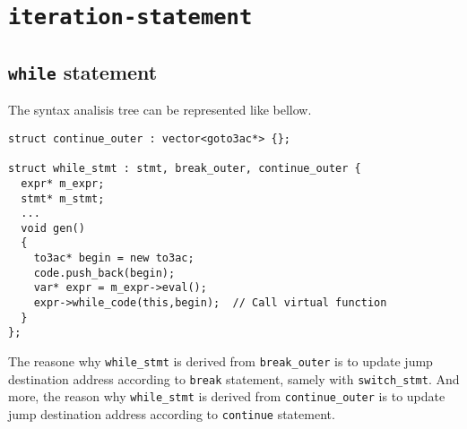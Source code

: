 \section{{\tt{iteration-statement}}}

\subsection{{\tt{while}} statement}
\label{stmt_e004}
The syntax analisis tree can be represented like bellow.
\begin{verbatim}
struct continue_outer : vector<goto3ac*> {};

struct while_stmt : stmt, break_outer, continue_outer {
  expr* m_expr;
  stmt* m_stmt;
  ...
  void gen()
  {
    to3ac* begin = new to3ac;
    code.push_back(begin);
    var* expr = m_expr->eval();
    expr->while_code(this,begin);  // Call virtual function
  }
};
\end{verbatim}
The reasone why {\tt{while\_stmt}} is derived from {\tt{break\_outer}}
is to update jump destination address according to {\tt{break}}
statement, samely with {\tt{switch\_stmt}}.
And more, the reason why
{\tt{while\_stmt}} is derived from {\tt{continue\_outer}}
is to update jump destination address according to {\tt{continue}}
statement.

